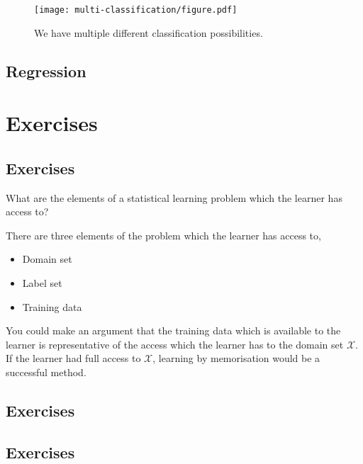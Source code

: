 \begin{figure}[!htb]
	\centering

	\texttt{[image: multi-classification/figure.pdf]}
	\caption{We have multiple different classification possibilities.}

\end{figure}


\subsection{Regression}



\section{Exercises}
\subsection{Exercises \basic}
\begin{exercise}
	\begin{problem}
	What are the elements of a statistical learning problem which the learner has access to?
	\end{problem}
	\begin{solution}
		There are three elements of the problem which the learner has access to,
		\begin{itemize}
			\item Domain set
			\item Label set
			\item Training data
		\end{itemize}

		You could make an argument that the training data which is available to the learner is representative of the access which the learner has to the domain set $ \mathcal{X} $. If the learner had full access to $ \mathcal{X} $, learning by memorisation would be a successful method.
	\end{solution}
\end{exercise}

\subsection{Exercises \intermediate}
\subsection{Exercises \challenging}
